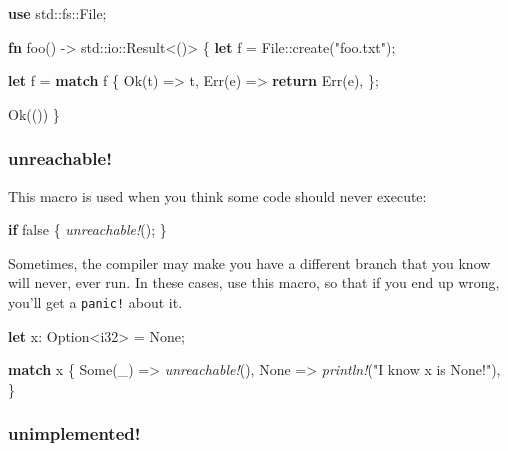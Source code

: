 \documentclass[a4paper,]{book}
\newenvironment{Shaded}{\begin{snugshade}}{\end{snugshade}}
\newcommand{\KeywordTok}[1]{\textcolor[rgb]{0.13,0.29,0.53}{\textbf{{#1}}}}
\newcommand{\DataTypeTok}[1]{\textcolor[rgb]{0.13,0.29,0.53}{{#1}}}
\newcommand{\ConstantTok}[1]{\textcolor[rgb]{0.00,0.00,0.00}{{#1}}}
\newcommand{\StringTok}[1]{\textcolor[rgb]{0.31,0.60,0.02}{{#1}}}
\newcommand{\PreprocessorTok}[1]{\textcolor[rgb]{0.56,0.35,0.01}{\textit{{#1}}}}
\newcommand{\NormalTok}[1]{{#1}}
\begin{document}
\begin{Shaded}
\begin{Highlighting}[]
\KeywordTok{use} \NormalTok{std::fs::File;}

\KeywordTok{fn} \NormalTok{foo() -> std::io::}\DataTypeTok{Result}\NormalTok{<()> \{}
    \KeywordTok{let} \NormalTok{f = File::create(}\StringTok{"foo.txt"}\NormalTok{);}

    \KeywordTok{let} \NormalTok{f = }\KeywordTok{match} \NormalTok{f \{}
        \ConstantTok{Ok}\NormalTok{(t) => t,}
        \ConstantTok{Err}\NormalTok{(e) => }\KeywordTok{return} \ConstantTok{Err}\NormalTok{(e),}
    \NormalTok{\};}

    \ConstantTok{Ok}\NormalTok{(())}
\NormalTok{\}}
\end{Highlighting}
\end{Shaded}

\subsubsection{unreachable!}\label{unreachable}

This macro is used when you think some code should never execute:

\begin{Shaded}
\begin{Highlighting}[]
\KeywordTok{if} \ConstantTok{false} \NormalTok{\{}
    \PreprocessorTok{unreachable!}\NormalTok{();}
\NormalTok{\}}
\end{Highlighting}
\end{Shaded}

Sometimes, the compiler may make you have a different branch that you
know will never, ever run. In these cases, use this macro, so that if
you end up wrong, you'll get a \texttt{panic!} about it.

\begin{Shaded}
\begin{Highlighting}[]
\KeywordTok{let} \NormalTok{x: }\DataTypeTok{Option}\NormalTok{<}\DataTypeTok{i32}\NormalTok{> = }\ConstantTok{None}\NormalTok{;}

\KeywordTok{match} \NormalTok{x \{}
    \ConstantTok{Some}\NormalTok{(_) => }\PreprocessorTok{unreachable!}\NormalTok{(),}
    \ConstantTok{None} \NormalTok{=> }\PreprocessorTok{println!}\NormalTok{(}\StringTok{"I know x is None!"}\NormalTok{),}
\NormalTok{\}}
\end{Highlighting}
\end{Shaded}

\subsubsection{unimplemented!}\label{unimplemented}
\end{document}
